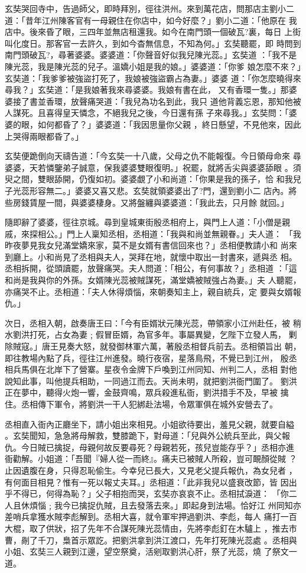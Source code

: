 \begin{pinyinscope}
{玄奘哭回寺中，告過師父，即時拜別，徑往洪州。來到萬花店，問那店主劉小二
道：「昔年江州陳客官有一母親住在你店中，如今好麼？」劉小二道：「他原在
我店中。後來昏了眼，三四年並無店租還我。如今在南門頭一個破瓦?裏，每日
上街叫化度日。那客官一去許久，到如今杳無信息，不知為何。」玄奘聽罷，即
時問到南門頭破瓦?，尋著婆婆。婆婆道：「你聲音好似我兒陳光蕊。」玄奘道
：「我不是陳光蕊，我是陳光蕊的兒子。溫嬌小姐是我的娘。」婆婆道：「你爹
娘怎麼不來？」玄奘道：「我爹爹被強盜打死了，我娘被強盜霸占為妻。」婆婆
道：「你怎麼曉得來尋我？」玄奘道：「是我娘著我來尋婆婆。我娘有書在此，
又有香環一隻。」那婆婆接了書並香環，放聲痛哭道：「我兒為功名到此，我只
道他背義忘恩，那知他被人謀死。且喜得皇天憐念，不絕我兒之後，今日還有孫
子來尋我。」玄奘問：「婆婆的眼，如何都昏了？」婆婆道：「我因思量你父親
，終日懸望，不見他來，因此上哭得兩眼都昏了。」

玄奘便跪倒向天禱告道：「今玄奘一十八歲，父母之仇不能報復。今日領母命來
尋婆婆，天若憐鑒弟子誠意，保我婆婆雙眼復明。」祝罷，就將舌尖與婆婆舔眼
。須臾之間，雙眼舔開，仍復如初。婆婆覷了小和尚道：「你果是我的孫子，恰
和我兒子光蕊形容無二。」婆婆又喜又悲。玄奘就領婆婆出了?門，還到劉小二
店內。將些房錢賃屋一間，與婆婆棲身。又將盤纏與婆婆道：「我此去，只月餘
就回。」

隨即辭了婆婆，徑往京城。尋到皇城東街殷丞相府上，與門上人道：「小僧是親
戚，來探相公。」門上人稟知丞相，丞相道：「我與和尚並無親眷。」夫人道：
「我昨夜夢見我女兒滿堂嬌來家，莫不是女婿有書信回來也？」丞相便教請小和
尚來到廳上。小和尚見了丞相與夫人，哭拜在地，就懷中取出一封書來，遞與丞
相。丞相拆開，從頭讀罷，放聲痛哭。夫人問道：「相公，有何事故？」丞相道
：「這和尚是我與你的外孫。女婿陳光蕊被賊謀死，滿堂嬌被賊強占為妻。」夫
人聽罷，亦痛哭不止。丞相道：「夫人休得煩惱，來朝奏知主上，親自統兵，定
要與女婿報仇。」

次日，丞相入朝，啟奏唐王曰：「今有臣婿狀元陳光蕊，帶領家小江州赴任，被
稍水劉洪打死，占女為妻﹔假冒臣婿，為官多年。事屬異變，乞陛下立發人馬，
剿除賊寇。」唐王見奏大怒，就發御林軍六萬，著殷丞相督兵前去。丞相領旨出
朝，即往教場內點了兵，徑往江州進發。曉行夜宿，星落鳥飛，不覺已到江州，
殷丞相兵馬俱在北岸下了營寨。星夜令金牌下戶喚到江州同知、州判二人，丞相
對他說知此事，叫他提兵相助，一同過江而去。天尚未明，就把劉洪衙門圍了。
劉洪正在夢中，聽得火炮一響，金鼓齊鳴，眾兵殺進私衙，劉洪措手不及，早被
擒住。丞相傳下軍令，將劉洪一干人犯綁赴法場，令眾軍俱在城外安營去了。

丞相直入衙內正廳坐下，請小姐出來相見。小姐欲待要出，羞見父親，就要自縊
。玄奘聞知，急急將母解救，雙膝跪下，對母道：「兒與外公統兵至此，與父報
仇。今日賊已擒捉，母親何故反要尋死？母親若死，孩兒豈能存乎？」丞相亦進
衙勸解。小姐道：「吾聞『婦人從一而終』。痛夫已被賊人所殺，豈可靦顏從賊
？止因遺腹在身，只得忍恥偷生。今幸兒已長大，又見老父提兵報仇，為女兒者
，有何面目相見？惟有一死以報丈夫耳。」丞相道：「此非我兒以盛衰改節，皆
因出乎不得已，何得為恥？」父子相抱而哭，玄奘亦哀哀不止。丞相拭淚道：
「你二人且休煩惱﹔我今已擒捉仇賊，且去發落去來。」即起身到法場。恰好江
州同知亦差哨兵拿獲水賊李彪解到。丞相大喜，就令軍牢押過劉洪、李彪，每人
痛打一百大棍，取了供狀，招了先年不合謀死陳光蕊情由，先將李彪釘在木驢上
，推去市曹，剮了千刀，梟首示眾訖。把劉洪拿到洪江渡口，先年打死陳光蕊處
。丞相與小姐、玄奘三人親到江邊，望空祭奠，活剜取劉洪心肝，祭了光蕊，燒
了祭文一道。

}
\end{pinyinscope}
